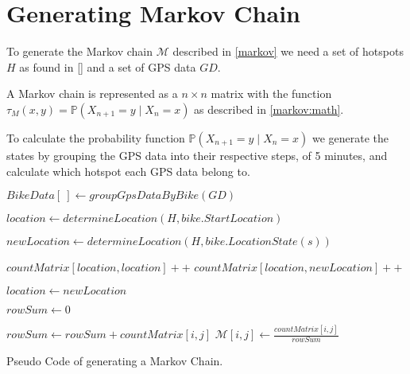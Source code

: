 \section{Generating Markov Chain}\label{sec:generatemarkov}
To generate the Markov chain $\mathcal{M}$ described in \cref{markov} we need a set of hotspots $H$ as found in \cref{} and a set of GPS data $GD$.

A Markov chain is represented as a $n \times n$ matrix with the function $\tau_M(x, y) = \mathbb{P}(X_{n + 1} = y \mid X_n = x)$ as described in \cref{markov:math}.

To calculate the probability function $\mathbb{P}(X_{n + 1} = y \mid X_n = x)$ we generate the states by grouping the GPS data into their respective steps, of 5 minutes, and calculate which hotspot each GPS data belong to.

\begin{algorithm}[H]
 

 
$BikeData[\ ] \gets groupGpsDataByBike(GD)$
 
{
	$location \gets determineLocation(H, bike.StartLocation)$
}
 
{
	{
 		$newLocation \gets determineLocation(H, bike.LocationState(s))$
 		
 		{
 			$countMatrix[location, location]++$
 		}
 		{
 			$countMatrix[location, newLocation]++$
 		}
 		
 		$location \gets newLocation$
 	}
}

{
	$rowSum \gets 0$
 	 
	{
 		$rowSum \gets rowSum + countMatrix[i, j]$
 	}
 	{
		$\mathcal{M}[i, j] \gets \frac{countMatrix[i, j]}{rowSum}$
	}
 }
 \caption{Pseudo Code of generating a Markov Chain.}
\end{algorithm}
